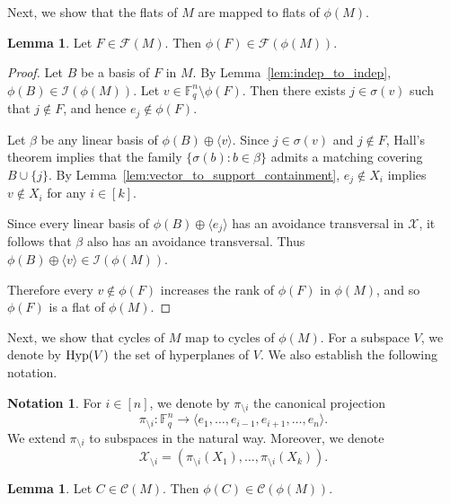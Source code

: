 \documentclass{article}
\theoremstyle{definition}
\newtheorem{notation}[theorem]{{{Notation}}}
\newtheorem{lemma}[theorem]{{{Lemma}}}
\begin{document}
Next, we show that the flats of $M$ are mapped to flats of $\phi(M)$.

\begin{lemma}\label{lem:flats_to_flats}
    Let $F\in\mathcal{F}(M)$. Then $\phi(F)\in\mathcal{F}(\phi(M))$.
\end{lemma}

\begin{proof}
    Let $B$ be a basis of $F$ in $M$. By Lemma~\ref{lem:indep_to_indep}, $\phi(B)\in\mathcal{I}(\phi(M))$. Let $v\in\mathbb{F}_q^n\setminus\phi(F)$. Then there exists $j\in\sigma(v)$ such that $j\notin F$, and hence $e_j\notin\phi(F)$.

    Let $\beta$ be any linear basis of $\phi(B)\oplus\langle v\rangle$. Since $j\in\sigma(v)$ and $j\notin F$, Hall's theorem implies that the family $\{\sigma(b):b\in\beta\}$ admits a matching covering $B\cup\{j\}$. By Lemma~\ref{lem:vector_to_support_containment}, $e_j\notin X_i$ implies $v\notin X_i$ for any $i\in[k]$.

    Since every linear basis of $\phi(B)\oplus\langle e_j\rangle$ has an avoidance transversal in $\mathcal{X}$, it follows that $\beta$ also has an avoidance transversal. Thus $\phi(B)\oplus\langle v\rangle\in\mathcal{I}(\phi(M))$.

    Therefore every $v\notin\phi(F)$ increases the rank of $\phi(F)$ in $\phi(M)$, and so $\phi(F)$ is a flat of $\phi(M)$.
\end{proof}

Next, we show that cycles of $M$ map to cycles of $\phi(M)$. For a subspace $V$, we denote by $\textup{Hyp}(V)$ the set of hyperplanes of $V$. We also establish the following notation.

\begin{notation}
    For $i\in[n]$, we denote by $\pi_{\setminus i}$ the canonical projection
    $$\pi_{\setminus i}:\mathbb{F}_q^n\to \langle e_1,\dots,e_{i-1},e_{i+1},\dots,e_n\rangle.$$
    We extend $\pi_{\setminus i}$ to subspaces in the natural way. Moreover, we denote
    $$\mathcal{X}_{\setminus i}=(\pi_{\setminus i}(X_1),\dots,\pi_{\setminus i}(X_k)).$$
\end{notation}

\begin{lemma}\label{lem:cycles_to_cycles}
    Let $C\in\mathcal{C}(M)$. Then $\phi(C)\in\mathcal{C}(\phi(M))$.
\end{lemma}
\end{document}
